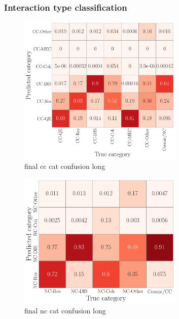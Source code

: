 \subsubsection*{Interaction type classification} %

\begin{figure} %
    \includegraphics[width=0.7\textwidth]{diagrams/6-cvn/chipsnet/final_cc_cat_confusion.pdf}
    \caption[final cc cat confusion short]
    {final cc cat confusion long}
    \label{fig:final_cc_cat_confusion}
\end{figure}

\begin{figure} %
    \includegraphics[width=0.7\textwidth]{diagrams/6-cvn/chipsnet/final_nc_cat_confusion.pdf}
    \caption[final nc cat confusion short]
    {final nc cat confusion long}
    \label{fig:final_nc_cat_confusion}
\end{figure}

